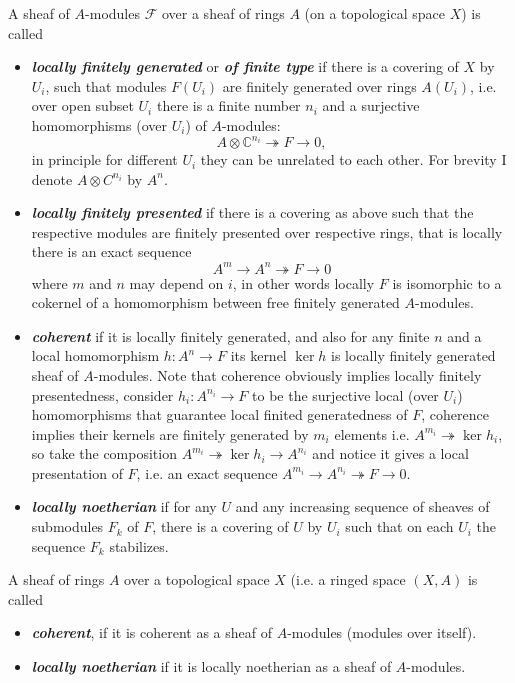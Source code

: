 \documentclass{article}
\newcommand{\C}{\mathbb{C}}
\newcommand{\Fc}{\mathcal{F}}
\begin{document}
\begin{defn}A sheaf of $A$-modules $\Fc$ over a sheaf of rings $A$ (on a topological space $X$) is called
	\begin{itemize}
		\item \textbf{\textit{locally finitely generated}} or \textbf{\textit{of finite type}} if there is a covering of $X$ by $U_i$, such that modules $F(U_i)$ are finitely generated over rings $A(U_i)$, i.e. over open subset $U_i$ there is a finite number $n_i$ and a surjective homomorphisms (over $U_i$) of $A$-modules: 
		\[A \otimes \C^{n_i}\twoheadrightarrow F\to 0,\] in principle for different $U_i$ they can be unrelated to each other.   For brevity I denote $A \otimes C^{n_i}$ by $A^n$.
		
		\item \textbf{\textit{locally finitely presented}} if there is a covering as above such that the respective modules are finitely presented over respective rings, that is  locally there is an exact sequence 
		\[A^m\to A^n\twoheadrightarrow F\to 0\]
		where $m$ and $n$ may depend on $i$, in other words locally $F$ is isomorphic to a cokernel of a homomorphism between free finitely generated $A$-modules.
		
		\item \textbf{\textit{coherent}} if it is locally finitely generated, and also for any finite $n$ and a local homomorphism $h : A^n \to F$ its kernel $\ker h$ is locally finitely generated sheaf of $A$-modules. Note that coherence obviously implies locally finitely presentedness,  consider $h_i : A^{n_i} \to F$ to be the surjective local (over $U_i$) homomorphisms that guarantee local finited generatedness of $F$, coherence implies their kernels are finitely generated by $m_i$ elements i.e. $A^{m_i} \twoheadrightarrow \ker h_i$, so take the composition $A^{m_i}\twoheadrightarrow \ker h_i \to A^{n_i}$ and notice it gives a local presentation of $F$, i.e. an exact sequence $A^{m_i} \to A^{n_i}\twoheadrightarrow F\to 0$.

		\item \textbf{\textit{locally noetherian}} if for any $U$ and any increasing sequence of sheaves of submodules $F_k$ of $F$, there is a covering of $U$ by $U_i$ such that on each $U_i$ the sequence $F_k$ stabilizes. 
	\end{itemize}
\end{defn}
\begin{defn}
	A sheaf of rings $A$ over a topological space $X$ (i.e.  a ringed space $(X,A)$ is called
	
	\begin{itemize}
		\item  \textbf{\textit{coherent}}, if it is coherent as a sheaf of $A$-modules (modules over itself).
		
		\item  \textbf{\textit{locally noetherian}} if it is locally noetherian as a sheaf of $A$-modules.
	\end{itemize}
\end{defn}
\end{document}
